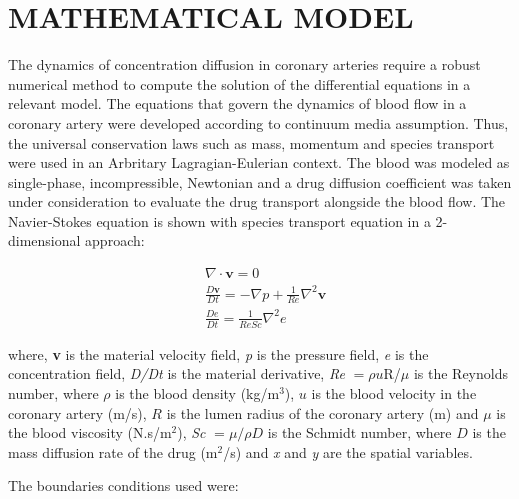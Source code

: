 \documentclass[10pt,fleqn,a4paper,twoside]{article}
\begin{document}
\section{MATHEMATICAL MODEL}
The dynamics of concentration diffusion in coronary 
arteries require a robust numerical method to compute 
the solution of the differential equations in a relevant model. The
equations that govern the dynamics of blood flow in a 
coronary artery were developed
according to continuum media assumption. 
Thus, the universal conservation laws such as
mass, momentum and species transport were used in an 
Arbritary Lagragian-Eulerian context. The blood was
modeled as single-phase, incompressible, 
Newtonian and a drug diffusion coefficient
was taken under consideration to evaluate 
the drug transport alongside the blood flow.
The Navier-Stokes equation is shown with 
species transport equation in a 2-dimensional approach: 

\begin{align}
& \nabla \cdot \textbf{v} 
= 0 \label{continuity}
\\[10pt] 
& \frac{D \textbf{v}}{D t} 
 =
 - \nabla p
 + \frac{1}{Re} \nabla^{2} \textbf{v} \label{vorticity}
 \\[10pt] 
& \frac{D e}{D t} 
 =
 \frac{1}{ReSc} \nabla^{2} e \label{especie quimica}
\end{align}


\noindent
where, 
\textbf{v} is the material velocity field,
\textit{p} is the pressure field,
\textit{e} is the concentration field,
\textit{D/Dt} is the material derivative,
\textit{Re} $= \rho u$R/$\mu$ is the Reynolds number,
where $\rho$ is the blood density (kg/m$^{3}$),
$u$ is the blood velocity in the coronary artery (m/s),
$R$ is the lumen radius of the coronary artery (m)
and $\mu$ is the blood viscosity (N.s/m$^{2}$),
\textit{Sc} $= \mu / \rho D$ is the Schmidt number,
where $D$ is the mass diffusion rate of the drug (m$^{2}$/s) and
\textit{x} and \textit{y} are the spatial variables.


\bigskip
\noindent
The boundaries conditions used were:
\end{document}
